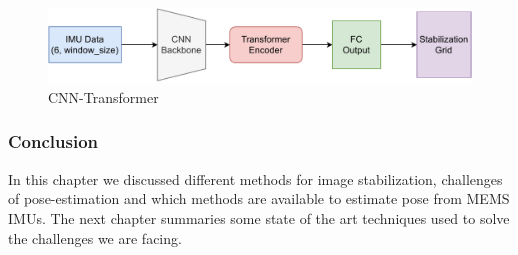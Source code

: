 \begin{figure}
    \centering
    \includegraphics[scale=0.7]{images/fig_chapter2/nns/transformer_cnn.pdf}
    \caption{CNN-Transformer}
    \label{fig:transformer_cnn}
\end{figure}

\subsubsection{Conclusion}
In this chapter we discussed different methods for image stabilization, challenges of pose-estimation  and which methods are available to estimate pose from MEMS IMUs. The next chapter summaries some state of the art techniques used to solve the challenges we are facing.
